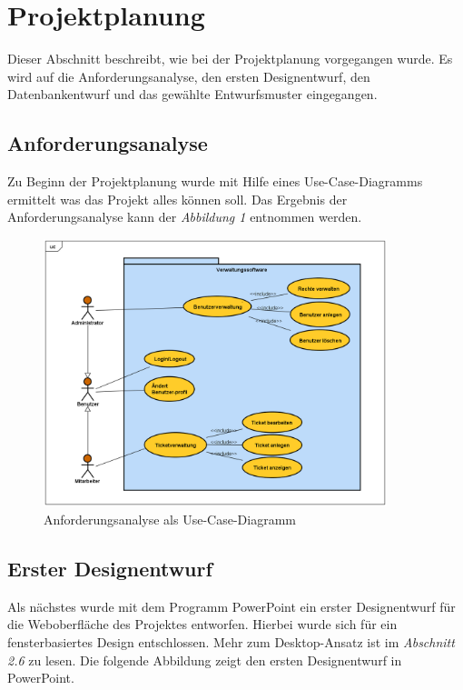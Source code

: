 \documentclass[12pt, a4paper]{article}
\begin{document}
\section{Projektplanung}
Dieser Abschnitt beschreibt, wie bei der Projektplanung vorgegangen wurde. Es wird auf die  Anforderungsanalyse, den ersten Designentwurf, den Datenbankentwurf und das gewählte Entwurfsmuster eingegangen.

\subsection{Anforderungsanalyse}
Zu Beginn der Projektplanung wurde mit Hilfe eines Use-Case-Diagramms ermittelt was das Projekt alles können soll. Das Ergebnis der Anforderungsanalyse kann der \textit{Abbildung 1} entnommen werden.

\begin{figure}[H]
	\begin{center}
	\includegraphics[width=100mm]{Bilder/UseCaseAnforderungsanalyse.png}
	\end{center}
	\caption{Anforderungsanalyse als Use-Case-Diagramm}
\end{figure}

\newpage
\subsection{Erster Designentwurf}

Als nächstes wurde mit dem Programm PowerPoint ein erster Designentwurf für die Weboberfläche des Projektes entworfen. Hierbei wurde sich für ein fensterbasiertes Design entschlossen. Mehr zum Desktop-Ansatz ist im \textit{Abschnitt 2.6} zu lesen. Die folgende Abbildung zeigt den ersten Designentwurf in PowerPoint.
\end{document}
